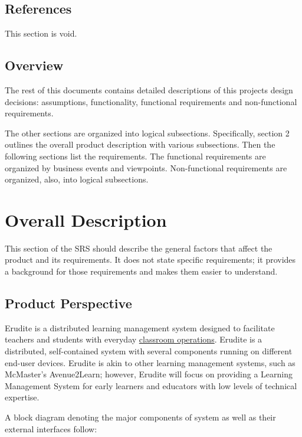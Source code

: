 \documentclass[]{article}
\begin{document}
\subsection{References}
\label{sub:references}
This section is void.


\subsection{Overview}
\label{sub:overview}
The rest of this documents contains detailed descriptions of this projects
design decisions: assumptions, functionality, functional requirements and
non-functional requirements.

The other sections are organized into logical subsections. Specifically, section
2 outlines the overall product description with various subsections. Then the
following sections list the requirements. The functional requirements are
organized by business events and viewpoints. Non-functional requirements are
organized, also, into logical subsections.




\section{Overall Description}
\label{sec:overall_description}

This section of the SRS should describe the general factors that affect the
product and its requirements. It does not state specific requirements; it
provides a background for those requirements and makes them easier to
understand.

\subsection{Product Perspective}
\label{sub:product_perspective}
Erudite is a distributed learning management system designed to facilitate
teachers and students with everyday \underline{classroom operations}. Erudite is
a distributed, self-contained system with several components running on
different end-user devices. Erudite is akin to other learning management
systems, such as McMaster's Avenue2Learn; however, Erudite will focus on
providing a Learning Management System for early learners and educators with
low levels of technical expertise.

A block diagram denoting the major components of system as well as their
external interfaces follow:
\end{document}
